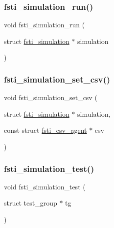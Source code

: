 \subsubsection{\texorpdfstring{fsti\+\_\+simulation\+\_\+run()}{fsti\_simulation\_run()}}
{\footnotesize\ttfamily void fsti\+\_\+simulation\+\_\+run (\begin{DoxyParamCaption}\item[{struct \mbox{\hyperlink{structfsti__simulation}{fsti\+\_\+simulation}} $\ast$}]{simulation }\end{DoxyParamCaption})}

\mbox{\label{fsti-simulation_8h_acfe68dac880c7a6112ac0d13bfc34cce}} 
\subsubsection{\texorpdfstring{fsti\+\_\+simulation\+\_\+set\+\_\+csv()}{fsti\_simulation\_set\_csv()}}
{\footnotesize\ttfamily void fsti\+\_\+simulation\+\_\+set\+\_\+csv (\begin{DoxyParamCaption}\item[{struct \mbox{\hyperlink{structfsti__simulation}{fsti\+\_\+simulation}} $\ast$}]{simulation,  }\item[{const struct \mbox{\hyperlink{structfsti__csv__agent}{fsti\+\_\+csv\+\_\+agent}} $\ast$}]{csv }\end{DoxyParamCaption})}

\mbox{\label{fsti-simulation_8h_a86e77278da10e20688210e211787e7d2}} 
\subsubsection{\texorpdfstring{fsti\+\_\+simulation\+\_\+test()}{fsti\_simulation\_test()}}
{\footnotesize\ttfamily void fsti\+\_\+simulation\+\_\+test (\begin{DoxyParamCaption}\item[{struct test\+\_\+group $\ast$}]{tg }\end{DoxyParamCaption})}

